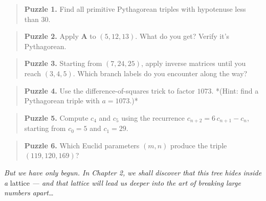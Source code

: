\begin{quote}
\textbf{Puzzle 1.} Find all primitive Pythagorean triples with hypotenuse less than $30$.
\end{quote}

\begin{quote}
\textbf{Puzzle 2.} Apply $\mathbf{A}$ to $(5, 12, 13)$. What do you get? Verify it's Pythagorean.
\end{quote}

\begin{quote}
\textbf{Puzzle 3.} Starting from $(7, 24, 25)$, apply inverse matrices until you reach $(3, 4, 5)$. Which branch labels do you encounter along the way?
\end{quote}

\begin{quote}
\textbf{Puzzle 4.} Use the difference-of-squares trick to factor $1073$. *(Hint: find a Pythagorean triple with $a = 1073$.)*
\end{quote}

\begin{quote}
\textbf{Puzzle 5.} Compute $c_4$ and $c_5$ using the recurrence $c_{n+2} = 6\,c_{n+1} - c_n$, starting from $c_0 = 5$ and $c_1 = 29$.
\end{quote}

\begin{quote}
\textbf{Puzzle 6.} Which Euclid parameters $(m, n)$ produce the triple $(119, 120, 169)$?
\end{quote}


\ornbreak


\textit{But we have only begun. In Chapter 2, we shall discover that this tree hides inside a} lattice \textit{--- and that lattice will lead us deeper into the art of breaking large numbers apart…}

